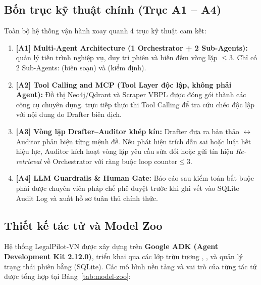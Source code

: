 \documentclass[10pt,a4paper]{article}
\begin{document}
\subsection{Bốn trục kỹ thuật chính (Trục A1 -- A4)}
Toàn bộ hệ thống vận hành xoay quanh 4 trục kỹ thuật cam kết:
\begin{enumerate}
  \item \textbf{[A1] Multi-Agent Architecture (1 Orchestrator + 2 Sub-Agents):}  quản lý tiến trình nghiệp vụ, duy trì phiên và biến đếm vòng lặp $\le 3$. Chỉ có 2 Sub-Agents:  (biên soạn) và  (kiểm định).
  \item \textbf{[A2] Tool Calling and MCP (Tool Layer độc lập, không phải Agent):} Đồ thị Neo4j/Qdrant và Scraper VBPL được đóng gói thành các công cụ chuyên dụng.  trực tiếp thực thi Tool Calling để tra cứu chéo độc lập với nội dung do Drafter biên dịch.
  \item \textbf{[A3] Vòng lặp Drafter--Auditor khép kín:} Drafter đưa ra bản thảo $\leftrightarrow$ Auditor phản biện từng mệnh đề. Nếu phát hiện trích dẫn sai hoặc luật hết hiệu lực, Auditor kích hoạt vòng lặp yêu cầu sửa đổi hoặc gửi tín hiệu \emph{Re-retrieval} về Orchestrator với ràng buộc $\text{loop counter} \le 3$.
  \item \textbf{[A4] LLM Guardrails \& Human Gate:} Báo cáo sau kiểm toán bắt buộc phải được chuyên viên pháp chế phê duyệt trước khi ghi vết vào SQLite Audit Log và xuất hồ sơ tuân thủ chính thức.
\end{enumerate}

\subsection{Thiết kế tác tử và Model Zoo}
Hệ thống LegalPilot-VN được xây dựng trên \textbf{Google ADK (Agent Development Kit 2.12.0)}, triển khai qua các lớp trừu tượng , ,  và quản lý trạng thái phiên bằng  (SQLite). Các mô hình nền tảng và vai trò của từng tác tử được tổng hợp tại Bảng~\ref{tab:model-zoo}:
\end{document}
